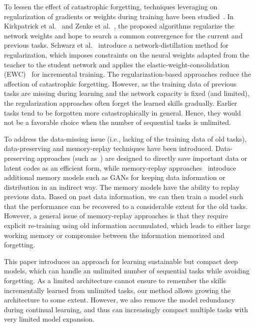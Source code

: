 \documentclass{article}
\begin{document}
To lessen the effect of catastrophic forgetting, techniques leveraging on regularization of gradients or weights during training have been studied~\cite{kirkpatrick2017overcoming,zenke2017continual, 17NeurIPS_Lee, Ritter2018OnlineSL}.
In Kirkpatrick et al.~\cite{kirkpatrick2017overcoming} and Zenke et al.~\cite{zenke2017continual}, the proposed algorithms regularize the network weights and hope to search a common convergence for the current and previous tasks.
Schwarz et al.~\cite{ICML18_Schwarz_ProgressC} introduce a network-distillation method for regularization, which imposes constraints on the neural weights adapted from the teacher to the student network and applies the elastic-weight-consolidation (EWC)~\cite{kirkpatrick2017overcoming} for incremental training.
The regularization-based approaches reduce the affection of catastrophic forgetting.
However, as the training data of previous tasks are missing during learning and the network capacity is fixed (and limited), the regularization approaches often forget the learned skills gradually.
Earlier tasks tend to be forgotten more catastrophically in general. 
Hence, they would not be a favorable choice when the number of sequential tasks is unlimited.

To address the data-missing issue (i.e., lacking of the training data of old tasks), data-preserving and memory-replay techniques have been introduced. 
Data-preserving approaches (such as~\cite{rebuffi2017icarl, brahma2018subset, 19ICLR_Hu, 19AAAI_Riemer}) are designed to directly save important data or latent codes as an efficient form, while memory-replay approaches~\cite{shin2017continual, Wu2018IncrementalCL, kemker2017fearnet, wu2018memory, ostapenko2019learning} introduce additional memory models such as GANs for keeping data information or distribution in an indirect way. 
The memory models have the ability to replay previous data. 
Based on past data information, we can then train a model such that the performance can be recovered to a considerable extent for the old tasks. 
However, a general issue of memory-replay approaches is that they require explicit re-training using old information accumulated, which leads to either large working memory or compromise between the information memorized and forgetting. 

This paper introduces an approach for learning sustainable but compact deep models, which can handle an unlimited number of sequential tasks while avoiding forgetting.
As a limited architecture cannot ensure to remember the skills incrementally learned from unlimited tasks, our method allows growing the architecture to some extent.
However, we also remove the model redundancy during continual learning, and thus can increasingly compact multiple tasks with very limited model expansion.
\end{document}
